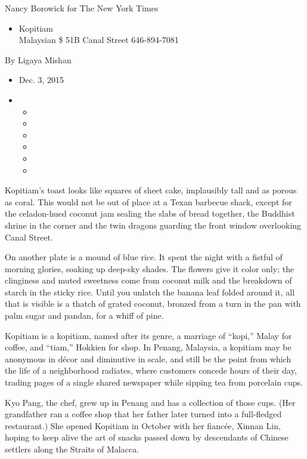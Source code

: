 Nancy Borowick for The New York Times

\begin{itemize}
\tightlist
\item
  Kopitiam\\
  Malaysian \$ 51B Canal Street 646-894-7081
\end{itemize}

By Ligaya Mishan

\begin{itemize}
\item
  Dec. 3, 2015
\item
  \begin{itemize}
  \item
  \item
  \item
  \item
  \item
  \item
  \end{itemize}
\end{itemize}

Kopitiam's toast looks like squares of sheet cake, implausibly tall and
as porous as coral. This would not be out of place at a Texan barbecue
shack, except for the celadon-hued coconut jam sealing the slabs of
bread together, the Buddhist shrine in the corner and the twin dragons
guarding the front window overlooking Canal Street.

On another plate is a mound of blue rice. It spent the night with a
fistful of morning glories, soaking up deep-sky shades. The flowers give
it color only; the clinginess and muted sweetness come from coconut milk
and the breakdown of starch in the sticky rice. Until you unlatch the
banana leaf folded around it, all that is visible is a thatch of grated
coconut, bronzed from a turn in the pan with palm sugar and pandan, for
a whiff of pine.

Kopitiam is a kopitiam, named after its genre, a marriage of ``kopi,''
Malay for coffee, and ``tiam,'' Hokkien for shop. In Penang, Malaysia, a
kopitiam may be anonymous in décor and diminutive in scale, and still be
the point from which the life of a neighborhood radiates, where
customers concede hours of their day, trading pages of a single shared
newspaper while sipping tea from porcelain cups.

Kyo Pang, the chef, grew up in Penang and has a collection of those
cups. (Her grandfather ran a coffee shop that her father later turned
into a full-fledged restaurant.) She opened Kopitiam in October with her
fiancée, Xinnan Lin, hoping to keep alive the art of snacks passed down
by descendants of Chinese settlers along the Straits of Malacca.

